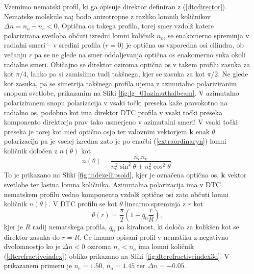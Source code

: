 \documentclass[longbibliography,slovene,a4paper,12pt]{book}
\begin{document}
Vzemimo nematski profil, ki ga opisuje direktor definiran z (\ref{dtcdirector}). Nematske molekule naj bodo anizotropne z razliko lomnih količnikov $\Delta n = n_o - n_e < 0$. Optična os takega profila, torej smer vzdolž katere polarizirana svetloba občuti izredni lomni količnik $n_e$, se enakomerno spreminja v radialni smeri -- v sredini profila ($r=0$) je optična os vzporedna osi cilindra, ob večanju $r$ pa se ne glede na smer oddaljevanja optična os enakomerno suka okoli radialne smeri. Običajno se direktor oziroma optična os v takem profilu zasuka za kot $\pi/4$, lahko pa si zamislimo tudi takšnega, kjer se zasuka za kot $\pi/2$. Ne glede kot zasuka, pa se simetrija takšnega profila ujema z azimutalno polariziranim snopom svetlobe, prikazanim na Sliki \ref{fig:lg_01azimuthalbeam}. V azimutalno polariziranem snopu polarizacija v vsaki točki preseka kaže pravokotno na radialno os, podobno kot ima direktor DTC profila v vsaki točki preseka komponento direktorja prav tako usmerjeno v azimutalni smeri! V vsaki točki preseka je torej kot med optično osjo ter valovnim vektorjem $\mathbf{k}$ enak $\theta$ polarizacija pa je vselej izredna zato je po enačbi (\ref{extraordinaryn}) lomni količnik določen z $n(\theta)$ kot
\begin{equation}
n(\theta) = \frac{n_o n_e}{n_e^2 \sin^2 \theta + n_o^2 \cos^2 \theta}.
\label{dtcrefractiveindex}
\end{equation}
To je prikazano na Sliki \ref{fig:indexellipsoid}, kjer je označena optična os, $\mathbf{k}$ vektor svetlobe ter lastna lomna količnika. Azimutalna polarizacija ima v DTC nematskem profilu vedno komponento vzdolž optične osi zato občuti lomni količnik $n(\theta)$. V DTC profilu se kot $\theta$ linearno spreminja z $r$ kot
\begin{equation}
\theta(r) = \frac{\pi}{2} (1-q_0\frac{r}{R}),
\end{equation}
kjer je $R$ radij nematskega profila, $q_0$ pa kiralnost, ki določa za kolikšen kot se direktor zasuka do $r = R$. Če imamo opisani profil v nematiku z negativno dvolomnostjo ko je $\Delta n < 0$ oziroma $n_e < n_o$ ima lomni količnik (\ref{dtcrefractiveindex}) obliko prikazano na Sliki \ref{fig:dtcrefractiveindex3d}. V prikazanem primeru je $n_e = 1.50$, $n_o = 1.45$ ter $\Delta n = -0.05$.\\
\end{document}
